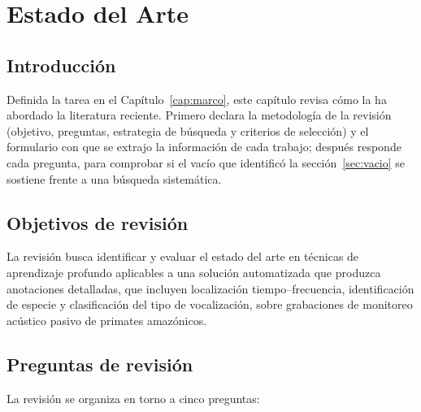 \chapter{Estado del Arte}
\label{cap:estado}

\section{Introducción}

Definida la tarea en el Capítulo~\ref{cap:marco}, este capítulo revisa cómo la ha
abordado la literatura reciente. Primero declara la metodología de la revisión
(objetivo, preguntas, estrategia de búsqueda y criterios de selección) y el
formulario con que se extrajo la información de cada trabajo; después responde
cada pregunta, para comprobar si el vacío que identificó la
sección~\ref{sec:vacio} se sostiene frente a una búsqueda sistemática.

\section{Objetivos de revisión}

La revisión busca identificar y evaluar el estado del arte en técnicas de
aprendizaje profundo aplicables a una solución automatizada que produzca
anotaciones detalladas, que incluyen localización tiempo--frecuencia,
identificación de especie y clasificación del tipo de vocalización, sobre grabaciones de
monitoreo acústico pasivo de primates amazónicos.

\section{Preguntas de revisión}

La revisión se organiza en torno a cinco preguntas:

